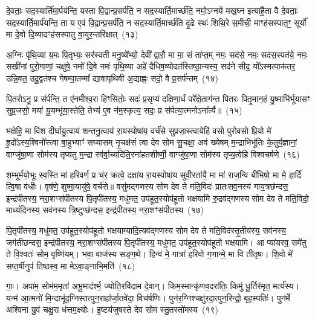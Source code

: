 दे॒वताः॒ सद॒स्यार्ति॑मा॒र्पय॑न्ति॒ यस्ता वि॒द्वान्प्र॒सर्प॑ति॒ न सद॒स्यार्ति॒मार्च्छ॑ति॒ नमो॒\-ऽग्नये॑ मख॒घ्न इत्या॑है॒ता वै दे॒वताः॒ सद॒स्यार्ति॒मार्प॑यन्ति॒ ता य ए॒वं वि॒द्वान्प्र॒सर्प॑ति॒ न सद॒स्यार्ति॒मार्च्छ॑ति दृ॒ढे स्थः॑ शिथि॒रे स॒मीची॒ माꣳह॑सस्पात॒ꣳ॒ सूर्यो॑ मा दे॒वो दि॒व्यादꣳह॑सस्पातु वा॒युर॒न्तरि॑क्षात्~(१३)

अ॒ग्निः पृ॑थि॒व्या य॒मः पि॒तृभ्यः॒ सर॑स्वती मनु॒ष्ये᳚भ्यो॒ देवी᳚ द्वारौ॒ मा मा॒ सं ता॑प्त॒म् नमः॒ सद॑से॒ नमः॒ सद॑स॒स्पत॑ये॒ नमः॒ सखी॑नां पुरो॒गाणां॒ चक्षु॑षे॒ नमो॑ दि॒वे नमः॑ पृथि॒व्या अहे॑ दैधिष॒व्योदत॑स्तिष्ठा॒न्यस्य॒ सद॑ने सीद॒ यो᳚\-ऽस्मत्पाक॑तर॒ उन्नि॒वत॒ उदु॒द्वत॑श्च गेषम्पा॒तम्मा᳚ द्यावापृथिवी अ॒द्याह्नः॒ सदो॒ वै प्र॒सर्प॑न्तम्~(१४)

पि॒तरो\-ऽनु॒ प्र स॑र्पन्ति॒ त ए॑नमीश्व॒रा हिꣳसि॑तोः॒ सदः॑ प्र॒सृप्य॑ दक्षिणा॒र्धं परे᳚क्षे॒ताग॑न्त पितरः पितृ॒मान॒हं यु॒ष्माभि॑र्भूयासꣳ सुप्र॒जसो॒ मया॑ यू॒यम्भू॑या॒स्तेति॒ तेभ्य॑ ए॒व न॑म॒स्कृत्य॒ सदः॒ प्र स॑र्पत्या॒त्मनो\-ऽना᳚र्त्यै॥~(१५)

{\anuvakamend[{म॒खो वा अ॒न्तरि॑क्षात्प्र॒सर्प॑न्त॒न्त्रय॑स्त्रिꣳशच्च}]}%

भक्षेहि॒ मा वि॑श दीर्घायु॒त्वाय॑ शन्तनु॒त्वाय॑ रा॒यस्पोषा॑य॒ वर्च॑से सुप्रजा॒स्त्वायेहि॑ वसो पुरोवसो प्रि॒यो मे॑ हृ॒दो᳚\-ऽस्य॒श्विनो᳚स्त्वा बा॒हुभ्याꣳ॑ सघ्यासम् नृ॒चक्ष॑सं त्वा देव सोम सु॒चक्षा॒ अव॑ ख्येषम् म॒न्द्राभिभू॑तिः के॒तुर्य॒ज्ञानां॒ वाग्जु॑षा॒णा सोम॑स्य तृप्यतु म॒न्द्रा स्व॑र्वा॒च्यदि॑ति॒रना॑हतशीर्ष्णी॒ वाग्जु॑षा॒णा सोम॑स्य तृप्य॒त्वेहि॑ विश्वचर्\mbox{}षणे~(१६)

श॒म्भूर्म॑यो॒भूः स्व॒स्ति मा॑ हरिवर्ण॒ प्र च॑र॒ क्रत्वे॒ दक्षा॑य रा॒यस्पोषा॑य सुवी॒रता॑यै॒ मा मा॑ राज॒न्वि बी॑भिषो॒ मा मे॒ हार्दि॑ त्वि॒षा व॑धीः। वृष॑णे॒ शुष्मा॒यायु॑षे॒ वर्च॑से॥ वसु॑मद्गणस्य सोम देव ते मति॒विदः॑ प्रातःसव॒नस्य॑ गाय॒त्रछ॑न्दस॒ इन्द्र॑पीतस्य॒ नरा॒शꣳस॑पीतस्य पि॒तृपी॑तस्य॒ मधु॑मत॒ उप॑हूत॒स्योप॑हूतो भक्षयामि रु॒द्रव॑द्गणस्य सोम देव ते मति॒विदो॒ माध्यं॑दिनस्य॒ सव॑नस्य त्रि॒ष्टुप्छ॑न्दस॒ इन्द्र॑पीतस्य॒ नरा॒शꣳस॑पीतस्य~(१७)

पि॒तृपी॑तस्य॒ मधु॑मत॒ उप॑हूत॒स्योप॑हूतो भक्षयाम्यादि॒त्यव॑द्गणस्य सोम देव ते मति॒विद॑स्तृ॒तीय॑स्य॒ सव॑नस्य॒ जग॑तीछन्दस॒ इन्द्र॑पीतस्य॒ नरा॒शꣳस॑पीतस्य पि॒तृपी॑तस्य॒ मधु॑मत॒ उप॑हूत॒स्योप॑हूतो भक्षयामि। आ प्या॑यस्व॒ समे॑तु ते वि॒श्वतः॑ सोम॒ वृष्णि॑यम्। भवा॒ वाज॑स्य सङ्ग॒थे। हिन्व॑ मे॒ गात्रा॑ हरिवो ग॒णान्मे॒ मा वि ती॑तृषः। शि॒वो मे॑ सप्त॒र्\mbox{}षीनुप॑ तिष्ठस्व॒ मा मे\-ऽवा॒ङ्नाभि॒मति॑~(१८)

गाः॒। अपा॑म॒ सोम॑म॒मृता॑ अभू॒माद॑र्श्म॒ ज्योति॒रवि॑दाम दे॒वान्। किम॒स्मान्कृ॑णव॒दरा॑तिः॒ किमु॑ धू॒र्तिर॑मृत॒ मर्त्य॑स्य। यन्म॑ आ॒त्मनो॑ मि॒न्दाभू॑द॒ग्निस्तत्पुन॒राहा᳚र्जा॒तवे॑दा॒ विच॑र्\mbox{}षणिः। पुन॑र॒ग्निश्चक्षु॑रदा॒त्पुन॒रिन्द्रो॒ बृह॒स्पतिः॑। पुन॑र्मे अश्विना यु॒वं चक्षु॒रा ध॑त्तम॒क्ष्योः। इ॒ष्टय॑जुषस्ते देव सोम स्तु॒तस्तो॑मस्य~(१९)


